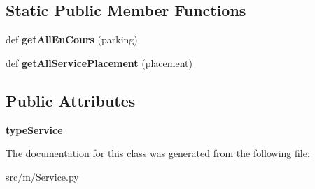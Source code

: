 \subsection*{Static Public Member Functions}
\begin{DoxyCompactItemize}
\item 
\hypertarget{classm_1_1_service_1_1_service_a297f867ad733338e013c5e5f2ac21ed2}{}def {\bfseries get\+All\+En\+Cours} (parking)\label{classm_1_1_service_1_1_service_a297f867ad733338e013c5e5f2ac21ed2}

\item 
\hypertarget{classm_1_1_service_1_1_service_a18de2ffb46354b3a934a761b502a8da4}{}def {\bfseries get\+All\+Service\+Placement} (placement)\label{classm_1_1_service_1_1_service_a18de2ffb46354b3a934a761b502a8da4}

\end{DoxyCompactItemize}
\subsection*{Public Attributes}
\begin{DoxyCompactItemize}
\item 
\hypertarget{classm_1_1_service_1_1_service_a8b25377b9a745d3bfbbead096ef25fee}{}{\bfseries type\+Service}\label{classm_1_1_service_1_1_service_a8b25377b9a745d3bfbbead096ef25fee}

\end{DoxyCompactItemize}


The documentation for this class was generated from the following file\+:\begin{DoxyCompactItemize}
\item 
src/m/Service.\+py\end{DoxyCompactItemize}
